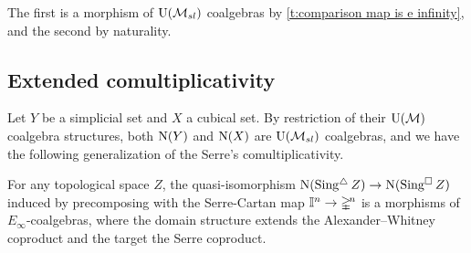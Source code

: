 The first is a morphism of ${\operatorname{U}(\mathcal{M}_{sl})}$ coalgebras by \cref{t:comparison map is e infinity}, and the second by naturality.

\subsection{Extended comultiplicativity} \label{ss:extended comultiplicativity}

Let $Y$ be a simplicial set and $X$ a cubical set.
By restriction of their ${\operatorname{U}(\mathcal{M})}$ coalgebra structures, both $\operatorname{N}(Y)$ and $\operatorname{N}(X)$ are ${\operatorname{U}(\mathcal{M}_{sl})}$ coalgebras, and we have the following generalization of the Serre's comultiplicativity.

\begin{theorem} \label{t:extended comultiplicativity}
	For any topological space $Z$, the quasi-isomorphism $\operatorname{N}(\operatorname{Sing^{\triangle}} Z) \to \operatorname{N}(\operatorname{Sing^{\square}} Z)$ induced by precomposing with the Serre-Cartan map $\mathbb{I}^n \to \mathbb{\Delta}^{\!n}$ is a morphisms of $E_\infty$-coalgebras, where the domain structure extends the Alexander--Whitney coproduct and the target the Serre coproduct.
\end{theorem}

%
